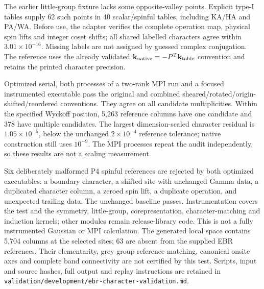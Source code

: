 \documentclass[11pt]{article}
\begin{document}
The earlier little-group fixture lacks some opposite-valley points.
Explicit type-I tables supply 62 such points in 40 scalar/spinful
tables, including KA/HA and PA/WA. Before use, the adapter verifies
the complete operation map, physical spin lifts and integer coset
shifts; all shared labelled characters agree within
$3.01\times10^{-16}$. Missing labels are not assigned by guessed
complex conjugation. The reference uses the already validated
$\mathbf k_{\rm native}=-P^T\mathbf k_{\rm table}$ convention and
retains the printed character precision.

Optimized serial, both processes of a two-rank MPI run and a focused
instrumented executable pass the original and combined
sheared/rotated/origin-shifted/reordered conventions. They agree on
all candidate multiplicities. Within the specified Wyckoff
position, 5,263 reference columns have one candidate and 378 have
multiple candidates. The largest dimension-scaled character
residual is $1.05\times10^{-5}$, below the unchanged
$2\times10^{-4}$ reference tolerance; native construction still
uses $10^{-9}$. The MPI processes repeat the audit independently,
so these results are not a scaling measurement.

Six deliberately malformed P4 spinful references are rejected by
both optimized executables: a boundary character, a shifted site
with unchanged Gamma data, a duplicated character column, a zeroed
spin lift, a duplicate operation, and unexpected trailing data.
The unchanged baseline passes. Instrumentation covers the test and
the symmetry, little-group, corepresentation, character-matching
and induction kernels; other modules remain release-library code.
This is not a fully instrumented Gaussian or MPI calculation.
The generated local space contains 5,704 columns at the selected
sites; 63 are absent from the supplied EBR references. Their
elementarity, grey-group reference matching, canonical onsite axes
and complete band connectivity are not certified by this test.
Scripts, input and source hashes, full output and replay instructions
are retained in
\texttt{validation/development/ebr-character-validation.md}.
\end{document}
